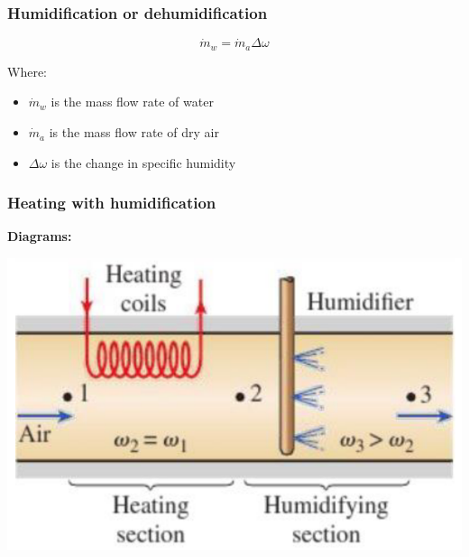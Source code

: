 \documentclass[11pt]{article}
\begin{document}
\subsubsection{Humidification or dehumidification}
\label{sec:org4c6f57c}
\[\dot{m}_w = \dot{m}_a \Delta \omega\]

Where:
\begin{itemize}
\item \(\dot{m}_w\) is the mass flow rate of water
\item \(\dot{m}_a\) is the mass flow rate of dry air
\item \(\Delta \omega\) is the change in specific humidity
\end{itemize}

\subsubsection{Heating with humidification}
\label{sec:org32d462a}
\textbf{Diagrams:}
\begin{center}
\includegraphics[scale=0.6]{./images/heating-with-humidification-diagram.png}
\end{center}
\end{document}

